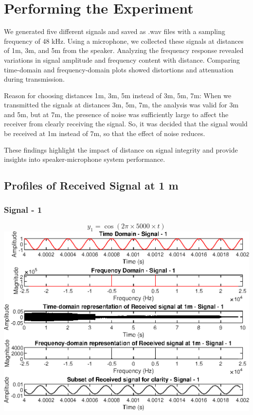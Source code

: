 \documentclass{report}
\begin{document}
\section{Performing the Experiment}

We generated five different signals and saved as .wav files with a sampling frequency of 48 kHz. Using a microphone, we collected these signals at distances of 1m, 3m, and 5m from the speaker. Analyzing the frequency response revealed variations in signal amplitude and frequency content with distance. Comparing time-domain and frequency-domain plots showed distortions and attenuation during transmission. 

Reason for choosing distances 1m, 3m, 5m instead of 3m, 5m, 7m:
When we transmitted the signals at distances 3m, 5m, 7m, the analysis was valid for 3m and 5m, but at 7m, the presence of noise was sufficiently large to affect the receiver from clearly receiving the signal. So, it was decided that the signal would be received at 1m instead of 7m, so that the effect of noise reduces.

These findings highlight the impact of distance on signal integrity and provide insights into speaker-microphone system performance.

\newpage
\subsection{Profiles of Received Signal at 1 m }


\subsubsection{Signal - 1}

$$ y_1 = \cos(2\pi \times 5000 \times t) $$
\includegraphics[width=1.1\linewidth]{1_1.eps}
\end{document}
